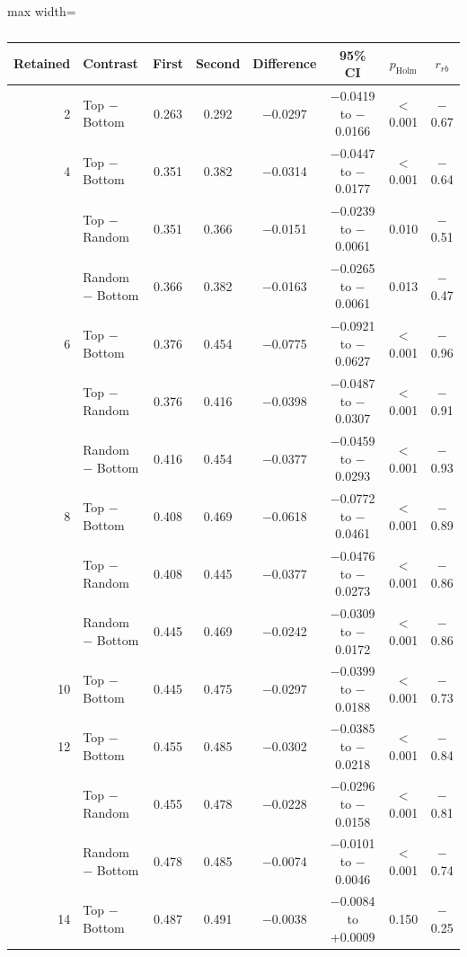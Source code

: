 \begin{table}[htbp]
\centering
\small
\caption{}
\label{tab:faithfulness}
\setlength{\tabcolsep}{4pt}
\begin{adjustbox}{max width=\textwidth}
\begin{tabular}{rlcccccc}
\toprule
Retained & Contrast & First & Second & Difference & 95\% CI & $p_{\mathrm{Holm}}$ & $r_{rb}$ \\
\midrule
2 & Top $-$ Bottom & 0.263 & 0.292 & $-$0.0297 & $-$0.0419 to $-$0.0166 & $<$0.001 & $-$0.67 \\
\midrule 4 & Top $-$ Bottom & 0.351 & 0.382 & $-$0.0314 & $-$0.0447 to $-$0.0177 & $<$0.001 & $-$0.64 \\
 & Top $-$ Random & 0.351 & 0.366 & $-$0.0151 & $-$0.0239 to $-$0.0061 & 0.010 & $-$0.51 \\
 & Random $-$ Bottom & 0.366 & 0.382 & $-$0.0163 & $-$0.0265 to $-$0.0061 & 0.013 & $-$0.47 \\
\midrule 6 & Top $-$ Bottom & 0.376 & 0.454 & $-$0.0775 & $-$0.0921 to $-$0.0627 & $<$0.001 & $-$0.96 \\
 & Top $-$ Random & 0.376 & 0.416 & $-$0.0398 & $-$0.0487 to $-$0.0307 & $<$0.001 & $-$0.91 \\
 & Random $-$ Bottom & 0.416 & 0.454 & $-$0.0377 & $-$0.0459 to $-$0.0293 & $<$0.001 & $-$0.93 \\
\midrule 8 & Top $-$ Bottom & 0.408 & 0.469 & $-$0.0618 & $-$0.0772 to $-$0.0461 & $<$0.001 & $-$0.89 \\
 & Top $-$ Random & 0.408 & 0.445 & $-$0.0377 & $-$0.0476 to $-$0.0273 & $<$0.001 & $-$0.86 \\
 & Random $-$ Bottom & 0.445 & 0.469 & $-$0.0242 & $-$0.0309 to $-$0.0172 & $<$0.001 & $-$0.86 \\
\midrule 10 & Top $-$ Bottom & 0.445 & 0.475 & $-$0.0297 & $-$0.0399 to $-$0.0188 & $<$0.001 & $-$0.73 \\
\midrule 12 & Top $-$ Bottom & 0.455 & 0.485 & $-$0.0302 & $-$0.0385 to $-$0.0218 & $<$0.001 & $-$0.84 \\
 & Top $-$ Random & 0.455 & 0.478 & $-$0.0228 & $-$0.0296 to $-$0.0158 & $<$0.001 & $-$0.81 \\
 & Random $-$ Bottom & 0.478 & 0.485 & $-$0.0074 & $-$0.0101 to $-$0.0046 & $<$0.001 & $-$0.74 \\
\midrule 14 & Top $-$ Bottom & 0.487 & 0.491 & $-$0.0038 & $-$0.0084 to +0.0009 & 0.150 & $-$0.25 \\
\bottomrule
\end{tabular}
\end{adjustbox}
\end{table}
